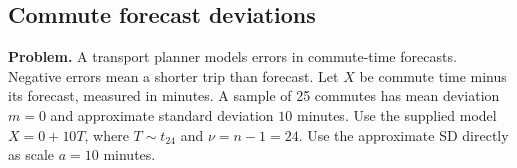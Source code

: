 
\clearpage
\subsection{Commute forecast deviations}
\label{c8-d5}
\textbf{Problem.} A transport planner models errors in commute-time forecasts. Negative errors mean a shorter trip than forecast. Let $X$ be commute time minus its forecast, measured in minutes. A sample of 25 commutes has mean deviation $m=0$ and approximate standard deviation $10$ minutes. Use the supplied model $X=0+10T$, where $T\sim t_{24}$ and $\nu=n-1=24$. Use the approximate SD directly as scale $a=10$ minutes.
